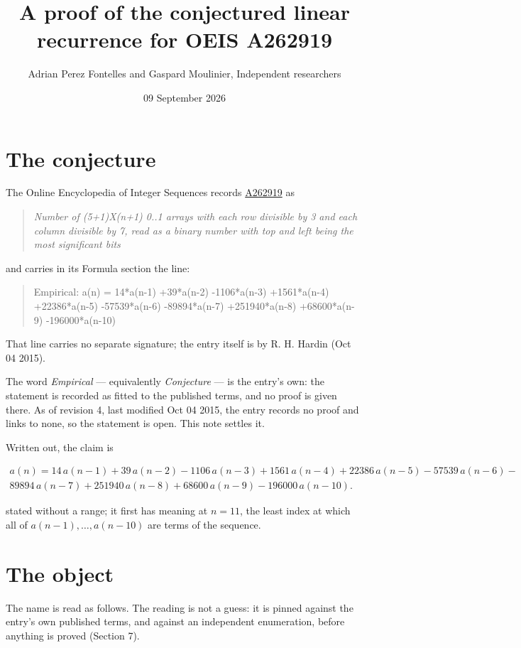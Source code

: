 \documentclass[11pt]{article}
\title{A proof of the conjectured linear recurrence for OEIS A262919}
\author{Adrian Perez Fontelles and Gaspard Moulinier, Independent researchers}
\date{09 September 2026}
\theoremstyle{definition}
\begin{document}
\maketitle
\section{The conjecture}

The Online Encyclopedia of Integer Sequences records \href{https://oeis.org/A262919}{A262919} as

\begin{quote}\itshape Number of (5+1)X(n+1) 0..1 arrays with each row divisible by 3 and each column divisible by 7, read as a binary number with top and left being the most significant bits\end{quote}

and carries in its Formula section the line:

\begin{quote}\ttfamily Empirical: a(n) = 14*a(n-1) +39*a(n-2) -1106*a(n-3) +1561*a(n-4) +22386*a(n-5) -57539*a(n-6) -89894*a(n-7) +251940*a(n-8) +68600*a(n-9) -196000*a(n-10)\end{quote}

That line carries no separate signature; the entry itself is by R. H. Hardin (Oct 04 2015).

The word {\itshape Empirical} --- equivalently {\itshape Conjecture} --- is the entry's own: the statement is recorded as fitted to the published terms, and no proof is given there. As of revision 4, last modified Oct 04 2015, the entry records no proof and links to none, so the statement is open. This note settles it.

Written out, the claim is

\begin{multline*} a(n) = 14\,a(n-1) + 39\,a(n-2) - 1106\,a(n-3) + 1561\,a(n-4) + 22386\,a(n-5) - 57539\,a(n-6) - \\ 89894\,a(n-7) + 251940\,a(n-8) + 68600\,a(n-9) - 196000\,a(n-10). \end{multline*}

stated without a range; it first has meaning at $n = 11$, the least index at which all of $a(n-1),\dots,a(n-10)$ are terms of the sequence.

\section{The object}

The name is read as follows. The reading is not a guess: it is pinned against the entry's own published terms, and against an independent enumeration, before anything is proved (Section 7).
\end{document}
